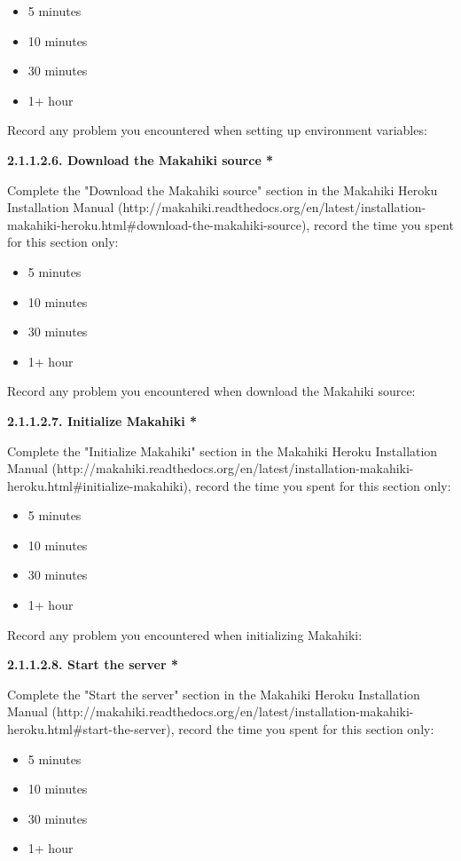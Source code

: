 \begin{itemize}
\item 5 minutes
\item  10 minutes
\item  30 minutes
\item  1+ hour
\end{itemize}

Record any problem you encountered when setting up environment variables:

{\bf 2.1.1.2.6. Download the Makahiki source *}

Complete the "Download the Makahiki source" section in the Makahiki Heroku Installation Manual (http://makahiki.readthedocs.org/en/latest/installation-makahiki-heroku.html\#download-the-makahiki-source), record the time you spent for this section only:

\begin{itemize}
\item 5 minutes
\item  10 minutes
\item  30 minutes
\item  1+ hour
\end{itemize}

Record any problem you encountered when download the Makahiki source:

{\bf 2.1.1.2.7. Initialize Makahiki *}

Complete the "Initialize Makahiki" section in the Makahiki Heroku Installation Manual (http://makahiki.readthedocs.org/en/latest/installation-makahiki-heroku.html\#initialize-makahiki), record the time you spent for this section only:

\begin{itemize}
\item 5 minutes
\item  10 minutes
\item  30 minutes
\item  1+ hour
\end{itemize}

Record any problem you encountered when initializing Makahiki:

{\bf 2.1.1.2.8. Start the server *}

Complete the "Start the server" section in the Makahiki Heroku Installation Manual (http://makahiki.readthedocs.org/en/latest/installation-makahiki-heroku.html\#start-the-server), record the time you spent for this section only:

\begin{itemize}
\item 5 minutes
\item  10 minutes
\item  30 minutes
\item  1+ hour
\end{itemize}

